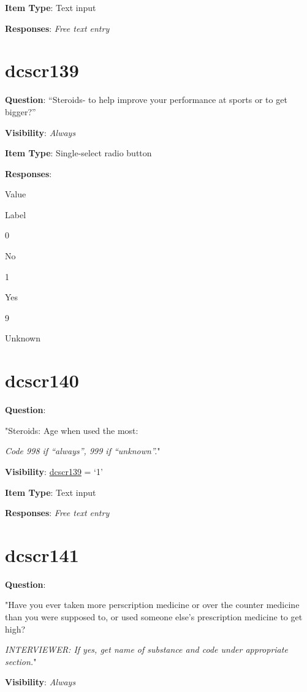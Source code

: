 \documentclass[]{book}
\begin{document}
\textbf{Item Type}: Text input

\textbf{Responses}: \emph{Free text entry}

\hypertarget{dcscr139}{%
\section{dcscr139}\label{dcscr139}}

\textbf{Question}: ``Steroids- to help improve your performance at sports or to get bigger?''

\textbf{Visibility}: \emph{Always}

\textbf{Item Type}: Single-select radio button

\textbf{Responses}:

Value

Label

0

No

1

Yes

9

Unknown

\hypertarget{dcscr140}{%
\section{dcscr140}\label{dcscr140}}

\textbf{Question}:

"Steroids: Age when used the most:

\emph{Code 998 if ``always'', 999 if ``unknown''.}"

\textbf{Visibility}: \protect\hyperlink{dcscr139}{dcscr139} = `1'

\textbf{Item Type}: Text input

\textbf{Responses}: \emph{Free text entry}

\hypertarget{dcscr141}{%
\section{dcscr141}\label{dcscr141}}

\textbf{Question}:

"Have you ever taken more perscription medicine or over the counter medicine than you were supposed to, or used someone else's prescription medicine to get high?

\emph{INTERVIEWER: If yes, get name of substance and code under appropriate section.}"

\textbf{Visibility}: \emph{Always}
\end{document}
